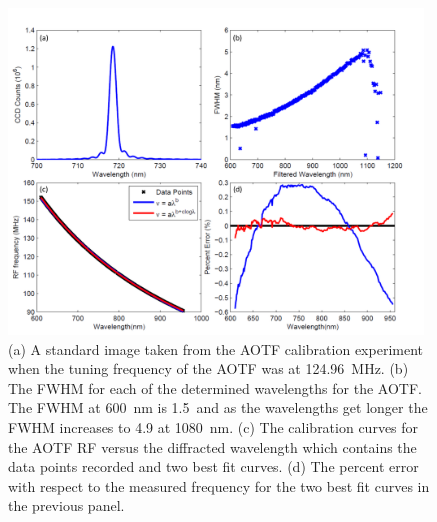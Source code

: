 \documentclass[12pt]{article}
\begin{document}
\clearpage

\begin{figure}
    \begin{subfigure}[t]{0\textwidth}
        \label{fig:3.1:AOTFCharaterization:a}
    \end{subfigure}
    \begin{subfigure}[t]{0\textwidth}
         \label{fig:3.1:AOTFCharaterization:b}
    \end{subfigure}
    \begin{subfigure}[t]{0\textwidth}
         \label{fig:3.1:AOTFCharaterization:c}
    \end{subfigure}
    \begin{subfigure}[t]{0\textwidth}
         \label{fig:3.1:AOTFCharaterization:d}
    \end{subfigure}
    \includegraphics[width=0.98\textwidth]{./Images/3-1-AOTFCharaterization.pdf}
    \caption{(a) A standard image taken from the AOTF calibration experiment when the tuning frequency of the AOTF was at 124.96~MHz. (b) The FWHM for each of the determined wavelengths for the AOTF. The FWHM at 600~nm is 1.5~and as the wavelengths get longer the FWHM increases to 4.9 at 1080~nm. (c) The calibration curves for the AOTF RF versus the  diffracted wavelength which contains the data points recorded and two best fit curves. (d) The percent error with respect to the measured frequency for the two best fit curves in the previous panel.}
    \label{fig:3.1:AOTFCharaterization}
\end{figure}
\end{document}
